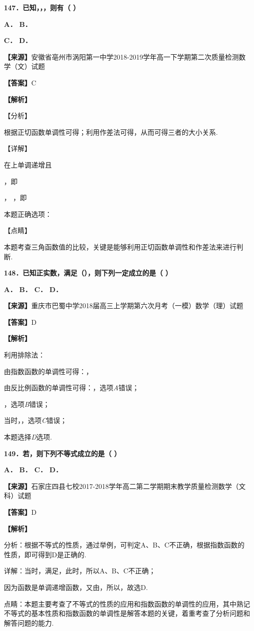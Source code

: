 \documentclass[
]{article}
\begin{document}
\textbf{147．已知，，，则有（ ）}

\textbf{A． B．}

\textbf{C． D．}

\textbf{【来源】}安徽省亳州市涡阳第一中学2018-2019学年高一下学期第二次质量检测数学（文）试题

\textbf{【答案】}C

\textbf{【解析】}

【分析】

根据正切函数单调性可得；利用作差法可得，从而可得三者的大小关系.

【详解】

在上单调递增且

，即

， ，即

本题正确选项：

【点睛】

本题考查三角函数值的比较，关键是能够利用正切函数单调性和作差法来进行判断.

\textbf{148．已知正实数，满足（），则下列一定成立的是（ ）}

\textbf{A． B． C． D．}

\textbf{【来源】}重庆市巴蜀中学2018届高三上学期第六次月考（一模）数学（理）试题

\textbf{【答案】}D

\textbf{【解析】}

利用排除法：

由指数函数的单调性可得：，

由反比例函数的单调性可得：，选项\emph{A}错误；

，选项\emph{B}错误；

当时，，选项\emph{C}错误；

本题选择\emph{D}选项.

\textbf{149．若，则下列不等式成立的是（ ）}

\textbf{A． B． C． D．}

\textbf{【来源】}石家庄四县七校2017-2018学年高二第二学期期末教学质量检测数学（文科）试题

\textbf{【答案】}D

\textbf{【解析】}

分析：根据不等式的性质，通过举例，可判定A、B、C不正确，根据指数函数的性质，即可得到D是正确的.

详解：当时，满足，此时，所以A、B、C不正确；

因为函数是单调递增函数，又由，所以，故选D.

点睛：本题主要考查了不等式的性质的应用和指数函数的单调性的应用，其中熟记不等式的基本性质和指数函数的单调性是解答本题的关键，着重考查了分析问题和解答问题的能力.
\end{document}
